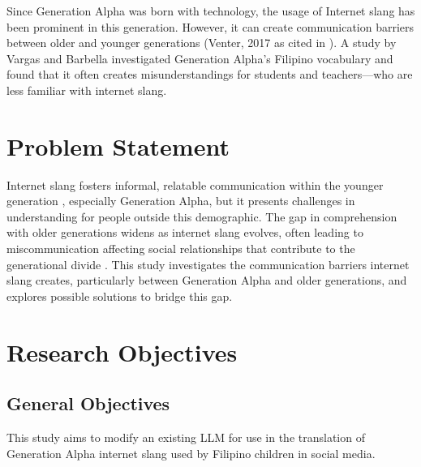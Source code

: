 Since Generation Alpha was born with technology, the usage of Internet slang has been prominent in this generation. However, it can create communication barriers between older and younger generations (Venter, 2017 as cited in \cite{Ghazali_Abdullah_2021}). A study by Vargas and Barbella \cite{Vargas_Marbella_2023a} investigated Generation Alpha's Filipino vocabulary and found that it often creates misunderstandings for students and teachers—who are less familiar with internet slang.

\section{Problem Statement}
\label{sec:problem_statement}
Internet slang fosters informal, relatable communication within the younger generation \cite{Ghazali_Abdullah_2021}, especially Generation Alpha, but it presents challenges in understanding for people outside this demographic. The gap in comprehension with older generations widens as internet slang evolves, often leading to miscommunication affecting social relationships that contribute to the generational divide \cite{Vacalares_Salas_Babac_Cagalawan_Calimpong_2023}. This study investigates the communication barriers internet slang creates, particularly between Generation Alpha and older generations, and explores possible solutions to bridge this gap.

\section{Research Objectives}
\label{sec:research_objectives}

\subsection{General Objectives}
\label{sec:general_objectives}
This study aims to modify an existing LLM for use in the translation of Generation Alpha internet slang used by Filipino children in social media.
